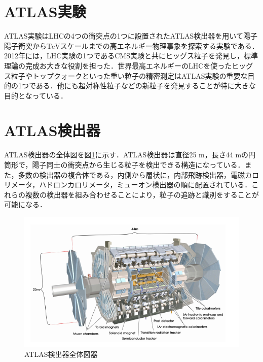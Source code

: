\section{ATLAS実験}
\label{sec:ATLAS-ex}
ATLAS実験はLHCの4つの衝突点の1つに設置されたATLAS検出器を用いて陽子陽子衝突から$\mathrm{TeV}$スケールまでの高エネルギー物理事象を探索する実験である．2012年には，LHC実験の1つであるCMS実験と共にヒッグス粒子を発見し，標準理論の完成お大きな役割を担った．世界最高エネルギーのLHCを使ったヒッグス粒子やトップクォークといった重い粒子の精密測定はATLAS実験の重要な目的の1つである．他にも超対称性粒子などの新粒子を発見することが特に大きな目的となっている．\par

\section{ATLAS検出器}
\label{sec:ATLAS}
ATLAS検出器の全体図を図\ref{fig:ATLAS}に示す．ATLAS検出器は直径25 $\mathrm{m}$，長さ44 $\mathrm{m}$の円筒形で，陽子同士の衝突点から生じる粒子を検出できる構造になっている．また，多数の検出器の複合体である，内側から層状に，内部飛跡検出器，電磁カロリメータ，ハドロンカロリメータ，ミューオン検出器の順に配置されている．これらの複数の検出器を組み合わせることにより，粒子の追跡と識別をすることが可能になる．\par
\begin{figure}[h]
\centering
\includegraphics[width=12cm]{./figure/ATLAS.png}
\caption{ATLAS検出器全体図器\cite{Collaboration_2008}}
\label{fig:ATLAS}
\end{figure}

